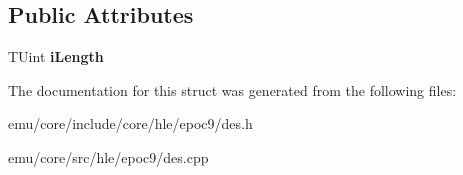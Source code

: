\subsection*{Public Attributes}
\begin{DoxyCompactItemize}
\item 
\mbox{\label{struct_t_des_c16_aa3fc927ce8f71d7631937cc7c2c9453e}} 
T\+Uint {\bfseries i\+Length}
\end{DoxyCompactItemize}


The documentation for this struct was generated from the following files\+:\begin{DoxyCompactItemize}
\item 
emu/core/include/core/hle/epoc9/des.\+h\item 
emu/core/src/hle/epoc9/des.\+cpp\end{DoxyCompactItemize}

